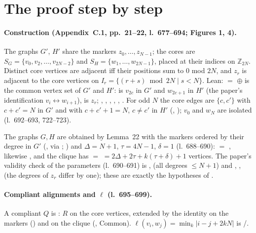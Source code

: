 \section{The proof step by step}

\paragraph{Construction (Appendix~C.1, pp.~21--22, l.~677--694; Figures 1, 4).} The graphs $G'$, $H'$ share the
markers $z_0,\dots,z_{N-1}$; the cores are $S_G=\{v_0,v_2,\dots,v_{2N-2}\}$ and $S_H=\{w_1,\dots,w_{2N-1}\}$,
placed at their indices on $\mathbb Z_{2N}$. Distinct core vertices are adjacent iff their positions sum to $0$
mod $2N$, and $z_r$ is adjacent to the core vertices on $I_r=\{(r+s)\bmod 2N\mid s<N\}$. Lean: 
$=$  $\oplus$  is the common vertex set of $G'$ and $H'$:  is $v_{2c}$ in
$G'$ and $w_{2c+1}$ in $H'$ (the paper's identification $v_i\leftrightarrow w_{i+1}$),  is $z_r$;
, , , , , . For odd $N$ the core edges
are $\{c,c'\}$ with $c+c'=N$ in $G'$ and with $c+c'+1=N$, $c\ne c'$ in $H'$ (,
); $v_0$ and $w_N$ are isolated (l.~692--693, 722--723).

The graphs $G,H$ are obtained by Lemma~22 with the markers ordered by their degree in $G'$ (,
via ; ) and $\Delta=N+1$, $\tau=4N-1$, $\delta=1$ (l.~688--690):
 $=$ , likewise , and the
clique has  $=$  $=2\Delta+2\tau+k(\tau+\delta)+1$ vertices.
The paper's validity check of the parameters (l.~690--691) is , 
(all degrees $\le N+1$) and , ,  (the degrees of $z_r$
differ by one); these are exactly the hypotheses of .

\paragraph{Compliant alignments and $\ell$ (l.~695--699).} A compliant $Q$ is :
$R$ on the core vertices, extended by the identity on the markers () and on the clique
(, Common). $\ell(v_i,w_j)=\min_k|i-j+2kN|$ is /.

